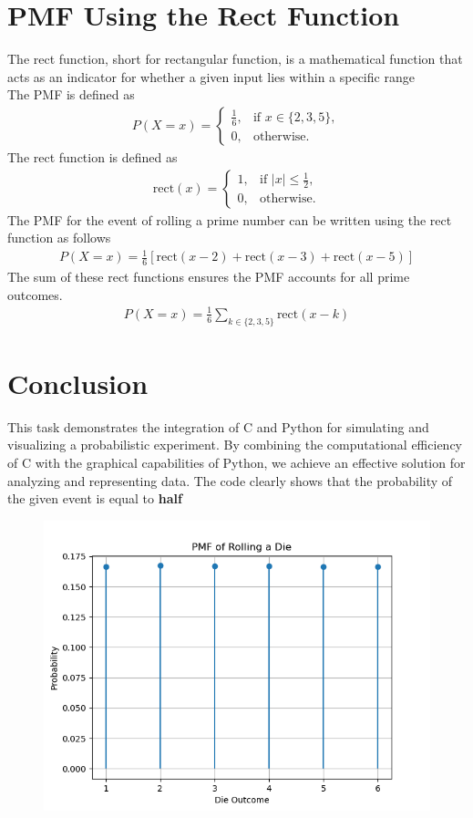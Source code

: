 \documentclass[journal]{IEEEtran}
\begin{document}
\section*{PMF Using the Rect Function}
The rect function, short for rectangular function, is a mathematical function that acts as an indicator for whether a given input lies within a specific range \\ 
The PMF is defined as
\begin{align*}
    P(X = x) =
\begin{cases} 
\frac{1}{6}, & \text{if } x \in \{2, 3, 5\}, \\
0, & \text{otherwise}.
\end{cases}
\end{align*}
The rect function is defined as 
\begin{align*}
    \text{rect}(x) =
\begin{cases}
1, & \text{if } |x| \leq \frac{1}{2}, \\
0, & \text{otherwise}.
\end{cases}
\end{align*}
The PMF for the event of rolling a prime number can be written using the rect function as follows
\begin{align*}
    P(X = x) = \frac{1}{6} \left[ \text{rect}(x - 2) + \text{rect}(x - 3) + \text{rect}(x - 5) \right]
\end{align*}
The sum of these rect functions ensures the PMF accounts for all prime outcomes.
\begin{align*}
    P(X = x) = \frac{1}{6} \sum_{k \in \{2, 3, 5\}} \text{rect}(x - k)
\end{align*}
\section*{Conclusion}
This task demonstrates the integration of C and Python for simulating and visualizing a probabilistic experiment. By combining the computational efficiency of C with the graphical capabilities of Python, we achieve an effective solution for analyzing and representing data. The code clearly shows that the probability of the given event is equal to \textbf{half}
\begin{figure}[h!]
   \centering
   \includegraphics[width=\columnwidth]{figs/Figure_1.png}
\end{figure}
\end{document}
